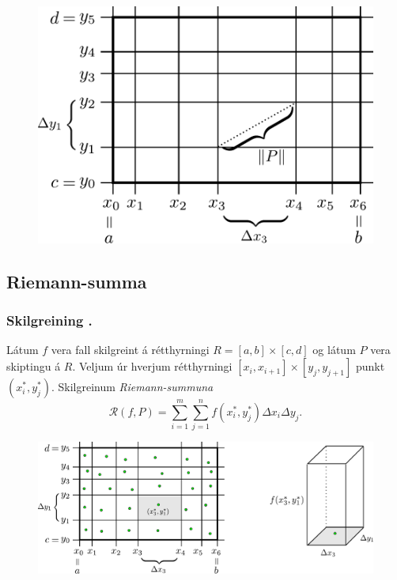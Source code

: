 \bigskip
 \begin {figure}[h!]
 \centering
            \includegraphics[width=.5\linewidth]{skipting.pdf}
            \caption*{}
\end {figure}



\subsection{Riemann-summa} 

\subsubsection{Skilgreining \kaflanr.}
  
 Látum $f$ vera fall skilgreint á rétthyrningi $R=[a,b]\times[c,d]$ og
 látum $P$ vera skiptingu á $R$.  Veljum úr hverjum rétthyrningi
 $[x_i,x_{i+1}]\times [y_j,y_{j+1}]$ punkt $(x_i^*, y_j^*)$.  
Skilgreinum \emph{Riemann-summuna}
$$\mathcal{R}(f,P)=\sum_{i=1}^m\sum_{j=1}^n f(x_i^*, y_j^*)\Delta x_i\Delta
  y_j.$$

   \begin {figure}[h!]
 \centering
            \includegraphics[width=.95\linewidth]{skipting2.pdf}
            \caption*{}
\end {figure}




